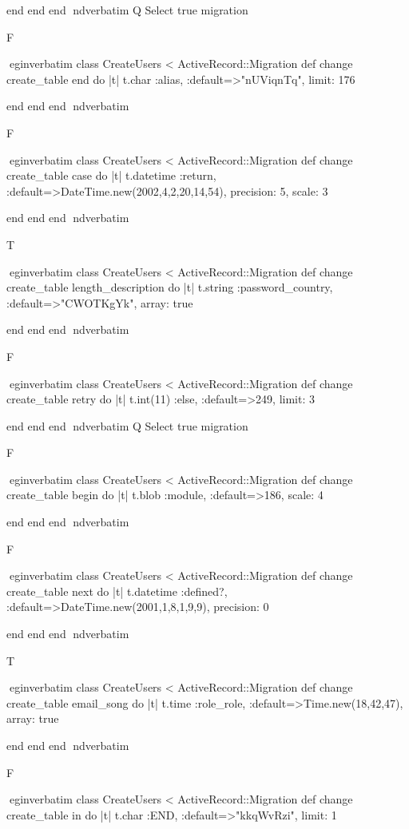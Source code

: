     end 
  end 
end
nd{verbatim}
Q
 Select true migration

F

egin{verbatim}
 class CreateUsers < ActiveRecord::Migration 
  def change 
    create_table end do |t| 
      t.char :alias, :default=>"nUViqnTq", limit: 176
    
    end 
  end 
end
nd{verbatim}

F

egin{verbatim}
 class CreateUsers < ActiveRecord::Migration 
  def change 
    create_table case do |t| 
      t.datetime :return, :default=>DateTime.new(2002,4,2,20,14,54), precision: 5, scale: 3
    
    end 
  end 
end
nd{verbatim}

T

egin{verbatim}
 class CreateUsers < ActiveRecord::Migration 
  def change 
    create_table length_description do |t| 
      t.string :password_country, :default=>"CWOTKgYk", array: true
    
    end 
  end 
end
nd{verbatim}

F

egin{verbatim}
 class CreateUsers < ActiveRecord::Migration 
  def change 
    create_table retry do |t| 
      t.int(11) :else, :default=>249, limit: 3
    
    end 
  end 
end
nd{verbatim}
Q
 Select true migration

F

egin{verbatim}
 class CreateUsers < ActiveRecord::Migration 
  def change 
    create_table begin do |t| 
      t.blob :module, :default=>186, scale: 4
    
    end 
  end 
end
nd{verbatim}

F

egin{verbatim}
 class CreateUsers < ActiveRecord::Migration 
  def change 
    create_table next do |t| 
      t.datetime :defined?, :default=>DateTime.new(2001,1,8,1,9,9), precision: 0
    
    end 
  end 
end
nd{verbatim}

T

egin{verbatim}
 class CreateUsers < ActiveRecord::Migration 
  def change 
    create_table email_song do |t| 
      t.time :role_role, :default=>Time.new(18,42,47), array: true
    
    end 
  end 
end
nd{verbatim}

F

egin{verbatim}
 class CreateUsers < ActiveRecord::Migration 
  def change 
    create_table in do |t| 
      t.char :END, :default=>"kkqWvRzi", limit: 1
    
